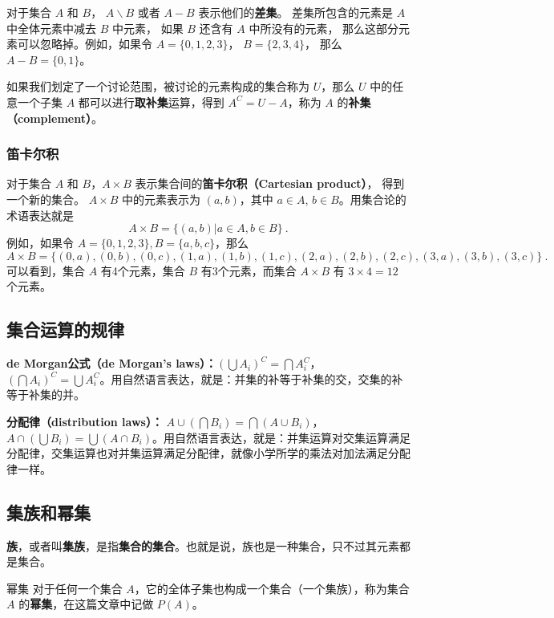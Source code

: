 对于集合 $A$ 和 $B$， $A\backslash B$ 或者 $A-B$ 表示他们的\textbf{差集}。 差集所包含的元素是 $A$ 中全体元素中减去 $B$ 中元素， 如果 $B$ 还含有 $A$ 中所没有的元素， 那么这部分元素可以忽略掉。例如，如果令 $A=\{0,1,2,3\}$， $B=\{2,3,4\}$， 那么 $A-B=\{0,1\}$。

如果我们划定了一个讨论范围，被讨论的元素构成的集合称为 $U$，那么 $U$ 中的任意一个子集 $A$ 都可以进行\textbf{取补集}运算，得到 $A^C=U-A$，称为 $A$ 的\textbf{补集（complement）}。

\subsubsection{笛卡尔积}
对于集合 $A$ 和 $B$，$A\times B$ 表示集合间的\textbf{笛卡尔积（Cartesian product）}， 得到一个新的集合。 $A\times B$ 中的元素表示为 $(a,b)$，其中 $a\in A$, $b\in B$。用集合论的术语表达就是
\begin{equation}\label{eq_Set_1}
A\times B=\{(a,b)|a\in A, b\in B\}~.
\end{equation}
例如，如果令 $A=\{0,1,2,3\}, B=\{a, b, c\}$，那么
\begin{equation}
A\times B=\{ (0,a),(0,b),(0,c),(1,a),(1,b),(1,c),(2,a),(2,b),(2,c),(3,a),(3,b),(3,c) \}~.
\end{equation}
可以看到，集合 $A$ 有4个元素，集合 $B$ 有3个元素，而集合 $A\times B$ 有 $3\times4 = 12$ 个元素。

\subsection{集合运算的规律}

\textbf{de Morgan公式（de Morgan's laws）：}$(\bigcup A_i)^C=\bigcap A_i^C$，$(\bigcap A_i)^C=\bigcup A_i^C$。用自然语言表达，就是：并集的补等于补集的交，交集的补等于补集的并。

\textbf{分配律（distribution laws）：} $A\cup(\bigcap B_i)=\bigcap (A\cup B_i)$，$A\cap(\bigcup B_i)=\bigcup (A\cap B_i)$。用自然语言表达，就是：并集运算对交集运算满足分配律，交集运算也对并集运算满足分配律，就像小学所学的乘法对加法满足分配律一样。


\subsection{集族和幂集}

\textbf{族}，或者叫\textbf{集族}，是指\textbf{集合的集合}。也就是说，族也是一种集合，只不过其元素都是集合。

\begin{definition}{幂集}
对于任何一个集合 $A$，它的全体子集也构成一个集合（一个集族），称为集合 $A$ 的\textbf{幂集}，在这篇文章中记做 $P(A)$。
\end{definition}

